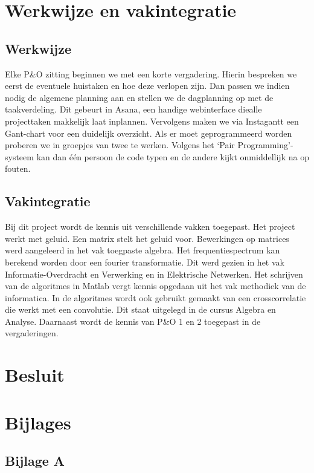 \documentclass[12pt]{report}
\begin{document}
\chapter*{Werkwijze en vakintegratie}
\section{Werkwijze}

Elke P\&O zitting beginnen we met een korte vergadering. Hierin bespreken we eerst de eventuele huistaken en hoe deze verlopen zijn. Dan passen we indien nodig de  algemene planning aan en stellen we de dagplanning op met de taakverdeling. Dit gebeurt in Asana, een handige webinterface diealle projecttaken makkelijk laat inplannen. Vervolgens maken we via Instagantt een Gant-chart voor een duidelijk overzicht. 
Als er moet geprogrammeerd worden proberen we in groepjes van twee te werken. Volgens het ‘Pair Programming’-systeem kan dan één persoon de code typen en de andere kijkt onmiddellijk na op fouten. 
\section{Vakintegratie}

Bij dit project wordt de kennis uit verschillende vakken toegepast. Het project werkt met geluid. Een matrix stelt het geluid voor. Bewerkingen op matrices werd aangeleerd in het vak toegpaste algebra. Het frequentiespectrum kan berekend worden door een fourier transformatie. Dit werd gezien in het vak Informatie-Overdracht en Verwerking en in Elektrische Netwerken. Het schrijven van de algoritmes in Matlab vergt kennis opgedaan uit het vak methodiek van de informatica. In de algoritmes wordt ook gebruikt gemaakt van een crosscorrelatie die werkt met een convolutie. Dit staat uitgelegd in de cursus Algebra en Analyse. Daarnaast wordt de kennis van P\&O 1 en 2 toegepast in de vergaderingen. 

\chapter*{Besluit}







\chapter*{Bijlages}
\section{Bijlage A}
\label{sec:bijlageA}
\end{document}
